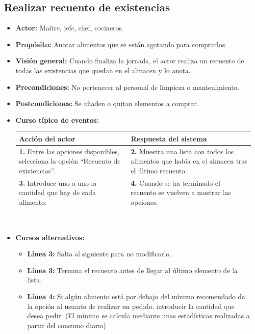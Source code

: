 \documentclass[spanish,a4paper,11pt, twoside]{report}	%
\begin{document}
	\subsection{Realizar recuento de existencias}
			\begin{itemize}
			\item \textbf{Actor:} Maître, jefe, chef, cocineros.
			\item \textbf{Propósito: } Anotar alimentos que se están agotando para comprarlos.
			\item \textbf{Visión general:} Cuando finaliza la jornada, el actor realiza un
				recuento de todas las existencias que quedan en el almacen y lo anota.
			\item \textbf{Precondiciones:} No pertenecer al personal de limpieza o mantenimiento.
			\item \textbf{Postcondiciones:} Se añaden o quitan elementos a comprar.
			\item \textbf{Curso típico de eventos:} 	\\
				\begin{tabular}{|p{6cm}||p{6cm}|}
				\hline
				\textbf{Acción del actor} & \textbf{Respuesta del sistema} \\ \hline
				\textbf{1.} Entre las opciones disponibles, selecciona la opción ``Recuento de existencias''. & 
				\textbf{2.} Muestra una lista con todos los alimentos que había en el almacen tras el último recuento. \\ \hline
				\textbf{3.} Introduce uno a uno la cantidad que hay de cada alimento. & 
				\textbf{4.} Cuando se ha terminado el recuento se vuelven a mostrar las opciones. \\ \hline
			\end{tabular}
			\\
			\item \textbf{Cursos alternativos:} 
			\begin{itemize}
				\item  \textbf{Línea 3:} Salta al siguiente para no
					modificarlo.
				\item  \textbf{Línea 3:} Termina el recuento antes de llegar al último
					elemento de la lista.
				\item  \textbf{Línea 4:} Si algún alimento está por debajo del mínimo
					recomendado da la opción al usuario de realizar un pedido.
					introducir la cantidad que desea pedir. (El mínimo se calcula mediante unas
					estadísticas realizadas a partir del consumo diario)
			\end {itemize}
		\end {itemize}
\end{document}
